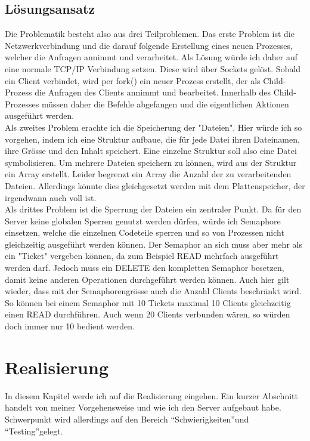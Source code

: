 \documentclass[12pt,a4paper,ngerman]{report}
\begin{document}
\section{Lösungsansatz}
Die Problematik besteht also aus drei Teilproblemen. Das erste Problem ist die Netzwerkverbindung und die darauf folgende Erstellung eines neuen Prozesses, welcher die Anfragen annimmt und verarbeitet. Als Lösung würde ich daher auf eine normale TCP/IP Verbindung setzen. Diese wird über Sockets gelöst. Sobald ein Client verbindet, wird per fork() ein neuer Prozess erstellt, der als Child-Prozess die Anfragen des Clients annimmt und bearbeitet. Innerhalb des Child-Prozesses müssen daher die Befehle abgefangen und die eigentlichen Aktionen ausgeführt werden.
\\
Als zweites Problem erachte ich die Speicherung der "Dateien". Hier würde ich so vorgehen, indem ich eine Struktur aufbaue, die für jede Datei ihren Dateinamen, ihre Grösse und den Inhalt speichert. Eine einzelne Struktur soll also eine Datei symbolisieren. Um mehrere Dateien speichern zu können, wird aus der Struktur ein Array erstellt. Leider begrenzt ein Array die Anzahl der zu verarbeitenden Dateien. Allerdings könnte dies gleichgesetzt werden mit dem Plattenspeicher, der irgendwann auch voll ist.
\\
Als drittes Problem ist die Sperrung der Dateien ein zentraler Punkt. Da für den Server keine globalen Sperren genutzt werden dürfen, würde ich Semaphore einsetzen, welche die einzelnen Codeteile sperren und so von Prozessen nicht gleichzeitig ausgeführt werden können. Der Semaphor an sich muss aber mehr als ein "Ticket" vergeben können, da zum Beispiel READ mehrfach ausgeführt werden darf. Jedoch muss ein DELETE den kompletten Semaphor besetzen, damit keine anderen Operationen durchgeführt werden können.
Auch hier gilt wieder, dass mit der Semaphorengrösse auch die Anzahl Clients beschränkt wird. So können bei einem Semaphor mit 10 Tickets maximal 10 Clients gleichzeitig einen READ durchführen. Auch wenn 20 Clients verbunden wären, so würden doch immer nur 10 bedient werden.
\chapter{Realisierung}
In diesem Kapitel werde ich auf die Realisierung eingehen. Ein kurzer Abschnitt handelt von meiner Vorgehensweise und wie ich den Server aufgebaut habe. Schwerpunkt wird allerdings auf den Bereich \textquotedblleft Schwierigkeiten\textquotedblright und \textquotedblleft Testing\textquotedblright gelegt.
\end{document}
